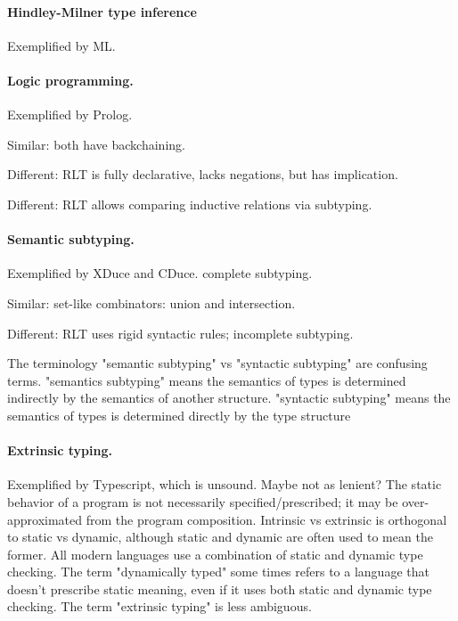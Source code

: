 \documentclass[acmsmall]{acmart}
\begin{document}
\paragraph{Hindley-Milner type inference}
Exemplified by ML.

\paragraph{Logic programming.}
Exemplified by Prolog. 

Similar: both have backchaining. 

Different: RLT is fully declarative, lacks negations, but has implication. 

Different: RLT allows comparing inductive relations via subtyping. 

\paragraph{Semantic subtyping.} 
Exemplified by XDuce and CDuce. complete subtyping.

Similar: set-like combinators: union and intersection.

Different: RLT uses rigid syntactic rules; incomplete subtyping.

The terminology "semantic subtyping" vs "syntactic subtyping" are confusing terms. 
"semantics subtyping" means the semantics of types is determined indirectly by the semantics of another structure.
"syntactic subtyping" means the semantics of types is determined directly by the type structure

\paragraph{Extrinsic typing.}
Exemplified by Typescript, which is unsound. Maybe not as lenient?  
The static behavior of a program is not necessarily specified/prescribed; 
it may be over-approximated from the program composition. 
Intrinsic vs extrinsic is orthogonal to static vs dynamic, although static and dynamic are often used to mean the former.
All modern languages use a combination of static and dynamic type checking.
The term "dynamically typed" some times refers to a language that doesn't prescribe static meaning,
even if it uses both static and dynamic type checking. The term "extrinsic typing" is less ambiguous.
\end{document}
